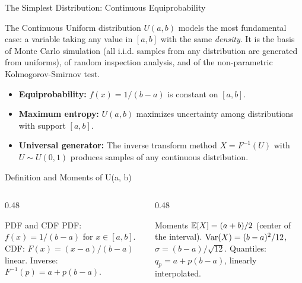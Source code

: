 \documentclass[aspectratio=169,xcolor={dvipsnames,table}]{beamer}
\begin{document}
\begin{frame}{The Simplest Distribution: Continuous Equiprobability}
	\footnotesize
	\begin{motivacion}
		The Continuous Uniform distribution $U(a, b)$ models the most fundamental case: a variable taking any value in $[a, b]$ with the same \emph{density}. It is the basis of Monte Carlo simulation (all i.i.d. samples from any distribution are generated from uniforms), of random inspection analysis, and of the non-parametric Kolmogorov-Smirnov test.
	\end{motivacion}
	\vspace{0.15cm}
	\pause
	\begin{itemize}\itemsep=0.1cm
		\item \textbf{Equiprobability:} $f(x) = 1/(b-a)$ is constant on $[a, b]$. \pause
		\item \textbf{Maximum entropy:} $U(a, b)$ maximizes uncertainty among distributions with support $[a, b]$. \pause
		\item \textbf{Universal generator:} The inverse transform method $X = F^{-1}(U)$ with $U \sim U(0, 1)$ produces samples of any continuous distribution.
	\end{itemize}
\end{frame}

\begin{frame}{Definition and Moments of U(a, b)}
	\vspace{-0.15cm}
	\begin{columns}[T]
		\begin{column}{0.48\textwidth}
			\begin{block}{PDF and CDF}
				\footnotesize
				PDF: $f(x) = 1/(b-a)$ for $x \in [a, b]$. CDF: $F(x) = (x-a)/(b-a)$ linear. Inverse: $F^{-1}(p) = a + p(b-a)$.
			\end{block}
		\end{column}
		\begin{column}{0.48\textwidth}
			\begin{alertblock}{Moments}
				\footnotesize
				$\mathbb{E}[X] = (a+b)/2$ (center of the interval). $\operatorname{Var}(X) = (b-a)^{2}/12$, $\sigma = (b-a)/\sqrt{12}$. Quantiles: $q_{p} = a + p(b-a)$, linearly interpolated.
			\end{alertblock}
		\end{column}
	\end{columns}
\end{frame}
\end{document}
